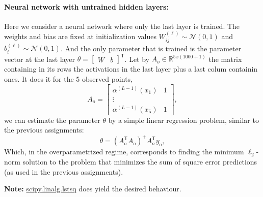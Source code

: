 \documentclass[a4paper,10pt]{article}
\newcommand{\trnsp}{\mathsf{T}}
\newcommand{\R}{\mathbb{R}}
\newcommand{\N}{\mathcal{N}}
\newenvironment{note}
{
\begin{center}
\begin{lrbox}{\mybox}
\begin{minipage}{42em}}
{\end{minipage}
\end{lrbox}\fbox{\usebox{\mybox}}
\end{center}}
\begin{document}
\paragraph{Neural network with untrained hidden layers:} Here we consider a neural network where only the last layer is trained. The weights and bias are fixed at initialization values $W^{(\ell)}_{ij} \sim \N(0, 1)$ and $b^{(\ell)}_{i} \sim \N(0, 1)$. And the only parameter that is trained is the parameter vector at the last layer $\theta = \begin{bmatrix}
    W & b
\end{bmatrix}^\trnsp$.  Let by $A_o\in \R^{5 x (1000+1)}$ the matrix containing in its rows the activations in the last layer plus a last colum containin ones. It does it for the 5 observed points,
\begin{equation}
    A_o =
    \begin{bmatrix}
     \alpha^{(L-1)}(x_1) & 1 \\
     \vdots \\
     \alpha^{(L-1)}(x_5) & 1
    \end{bmatrix},
\end{equation}
we can estimate the parameter $\theta$ by a simple linear regression problem, similar to the previous assignments:
\begin{equation}
\label{eq:ls-sol}
\theta = (A_o^\trnsp A_o)^{+} A_o^\trnsp y_o,
\end{equation}
Which, in the overparametrized regime, corresponds to finding the minimum $\ell_2$-norm solution to the problem that minimizes the sum of square error predictions (as used in the previous assignments).

\begin{note}
\textbf{Note:} \href{https://docs.scipy.org/doc/scipy/reference/generated/scipy.linalg.lstsq.html}{scipy.linalg.lstsq} does yield the desired behaviour.
\end{note}
\end{document}
